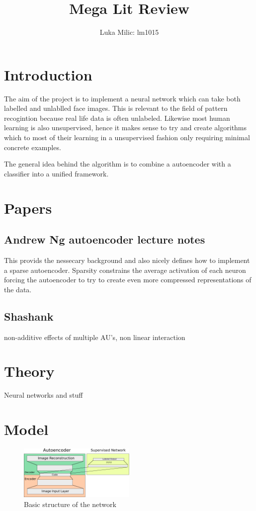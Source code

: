 \documentclass[11pt]{article}
\title{Mega Lit Review}
\author{Luka Milic: lm1015}
\begin{document}
\maketitle
\section{Introduction}
The aim of the project is to implement a neural network which can take both labelled and unlablled face images. \cite{tensorflow2015-whitepaper}
This is relevant to the field of pattern recogintion because real life data is often unlabeled.
Likewise most human learning is also unsupervised, hence it makes sense to try and create algorithms which
to most of their learning in a unsupervised fashion only requiring minimal concrete examples.

The general idea behind the algorithm is to combine a autoencoder with a classifier into a unified
framework.
\section{Papers}
\subsection{Andrew Ng autoencoder lecture notes}
This provids the nessecary background and also nicely defines
how to implement a sparse autoencoder. Sparsity constrains the average
activation of each neuron forcing the autoencoder to try to create even more
compressed representations of the data.
\subsection{Shashank}
non-additive effects of multiple AU's, non linear interaction
\section{Theory}
Neural networks and stuff\cite{jaiswal_deep_2016}
\section{Model}
\begin{figure}
  \begin{center}
    \includegraphics[width=0.5\textwidth]{illustrations/network_01.pdf}
  \end{center}
  \caption{Basic structure of the network}
\end{figure}
\end{document}
